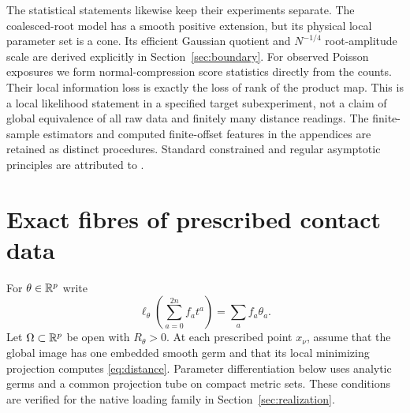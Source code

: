 The statistical statements likewise keep their experiments separate. The coalesced-root model has a smooth positive extension, but its physical local parameter set is a cone. Its efficient Gaussian quotient and $N^{-1/4}$ root-amplitude scale are derived explicitly in Section~\ref{sec:boundary}. For observed Poisson exposures we form normal-compression score statistics directly from the counts. Their local information loss is exactly the loss of rank of the product map. This is a local likelihood statement in a specified target subexperiment, not a claim of global equivalence of all raw data and finitely many distance readings. The finite-sample estimators and computed finite-offset features in the appendices are retained as distinct procedures. Standard constrained and regular asymptotic principles are attributed to \cite{Geyer,vdV}.

\section{Exact fibres of prescribed contact data}\label{sec:contact}
For $\theta\in\mathbb R^p$ write
\[
 \ell_\theta\left(\sum_{a=0}^{2n}f_at^a\right)=\sum_a f_a\theta_a.
\]
Let $\Omega\subset\mathbb R^p$ be open with $R_\theta>0$. At each prescribed point $x_\nu$, assume that the global image has one embedded smooth germ and that its local minimizing projection computes \eqref{eq:distance}. Parameter differentiation below uses analytic germs and a common projection tube on compact metric sets. These conditions are verified for the native loading family in Section~\ref{sec:realization}.


